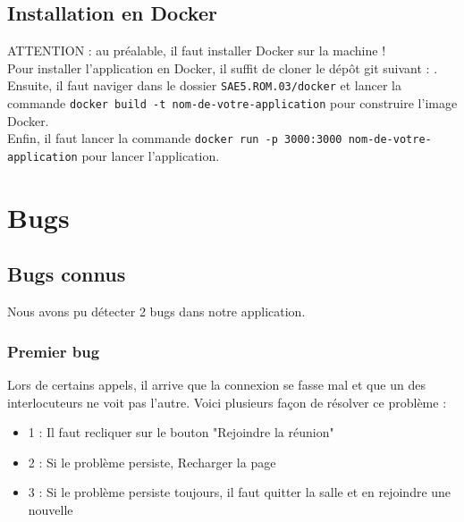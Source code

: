 \documentclass[12pt, a4paper, oneside]{Thesis}
\begin{document}
\subsection{Installation en Docker}

ATTENTION : au préalable, il faut installer Docker sur la machine !\\

Pour installer l'application en Docker, il suffit de cloner le dépôt git suivant : \url{}{}.\\

Ensuite, il faut naviger dans le dossier \verb|SAE5.ROM.03/docker| et lancer la commande \verb|docker build -t nom-de-votre-application| pour construire l'image Docker.\\

Enfin, il faut lancer la commande \verb|docker run -p 3000:3000 nom-de-votre-application| pour lancer l'application.\\

\newpage

\section{Bugs}

\subsection{Bugs connus}

Nous avons pu détecter 2 bugs dans notre application.\\

\subsubsection{Premier bug}

Lors de certains appels, il arrive que la connexion se fasse mal et que un des interlocuteurs ne voit pas l'autre. Voici plusieurs façon de résolver ce problème :\\

\begin{itemize}
  \item 1 : Il faut recliquer sur le bouton "Rejoindre la réunion"
  \item 2 : Si le problème persiste, Recharger la page
  \item 3 : Si le problème persiste toujours, il faut quitter la salle et en rejoindre une nouvelle
\end{itemize}
\end{document}
